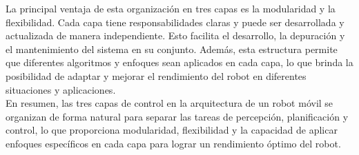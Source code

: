 \documentclass{article}
\begin{document}
\begin{itemize}
  La principal ventaja de esta organización en tres capas es la modularidad y la flexibilidad. Cada capa tiene responsabilidades claras y puede ser desarrollada y actualizada de manera independiente. Esto facilita el desarrollo, la depuración y el mantenimiento del sistema en su conjunto. Además, esta estructura permite que diferentes algoritmos y enfoques sean aplicados en cada capa, lo que brinda la posibilidad de adaptar y mejorar el rendimiento del robot en diferentes situaciones y aplicaciones.\\
  

  En resumen, las tres capas de control en la arquitectura de un robot móvil se organizan de forma natural para separar las tareas de percepción, planificación y control, lo que proporciona modularidad, flexibilidad y la capacidad de aplicar enfoques específicos en cada capa para lograr un rendimiento óptimo del robot.
  
\end{itemize}
  
\end{document}

